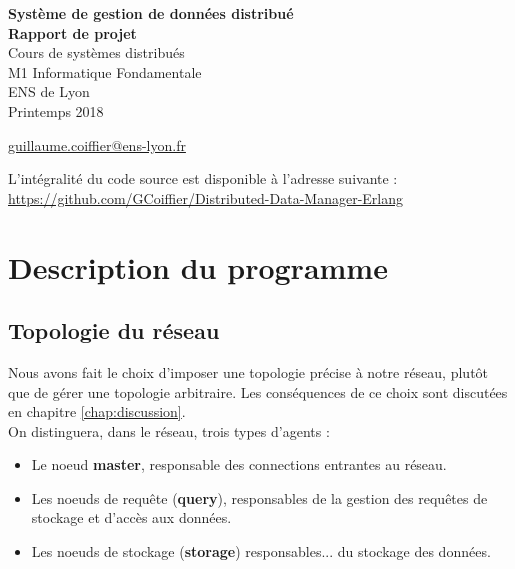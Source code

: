 \documentclass[a4paper]{article}
\begin{document}
\begin{titlepage}
\begin{center}
 {\Huge \bfseries Système de gestion de données distribué\\}
 \vspace{1cm}
 {\Large \bfseries Rapport de projet \\}
 \vspace{2cm}
 {\Large Cours de systèmes distribués \\ M1 Informatique Fondamentale \\ ENS de Lyon \\ Printemps 2018 \\}

 \vspace{2cm}

{\Large {} \color{black}
	\href{mailto:guillaume.coiffier@ens-lyon.fr}{guillaume.coiffier@ens-lyon.fr}\\
}

\vfill
L'intégralité du code source est disponible à l'adresse suivante : \\
\url{https://github.com/GCoiffier/Distributed-Data-Manager-Erlang}

\end{center}
\tableofcontents
\vspace{4cm}
\end{titlepage}

\section{Description du programme}
\label{chap:description}

\subsection{Topologie du réseau}

Nous avons fait le choix d'imposer une topologie précise à notre réseau, plutôt que de gérer une topologie arbitraire.
Les conséquences de ce choix sont discutées en chapitre \ref{chap:discussion}. \\
On distinguera, dans le réseau, trois types d'agents :
\begin{itemize}
\item Le noeud \textbf{master}, responsable des connections entrantes au réseau.
\item Les noeuds de requête (\textbf{query}), responsables de la gestion des
requêtes de stockage et d'accès aux données.
\item Les noeuds de stockage (\textbf{storage}) responsables... du stockage des données.
\end{itemize}
\end{document}
